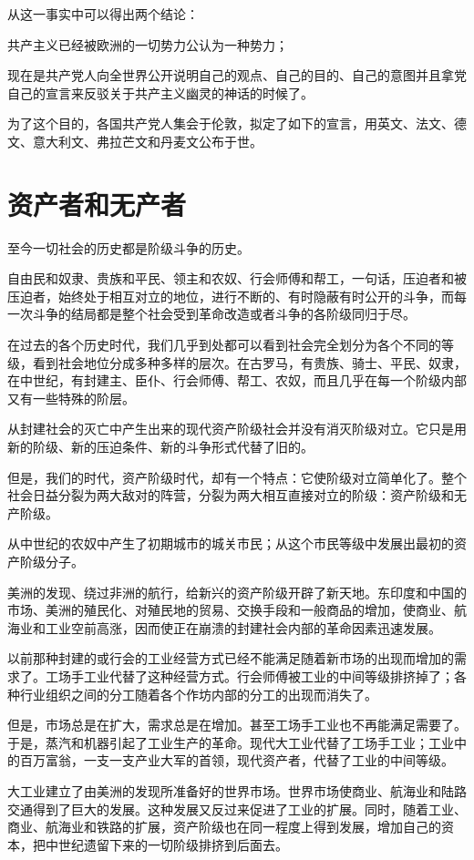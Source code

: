 \documentclass[10pt, UTF8]{book} %
\begin{document}
从这一事实中可以得出两个结论：

共产主义已经被欧洲的一切势力公认为一种势力；

现在是共产党人向全世界公开说明自己的观点、自己的目的、自己的意图并且拿党自己的宣言来反驳关于共产主义幽灵的神话的时候了。

为了这个目的，各国共产党人集会于伦敦，拟定了如下的宣言，用英文、法文、德文、意大利文、弗拉芒文和丹麦文公布于世。

\section{资产者和无产者}

至今一切社会的历史都是阶级斗争的历史。

自由民和奴隶、贵族和平民、领主和农奴、行会师傅和帮工，一句话，压迫者和被压迫者，始终处于相互对立的地位，进行不断的、有时隐蔽有时公开的斗争，而每一次斗争的结局都是整个社会受到革命改造或者斗争的各阶级同归于尽。

在过去的各个历史时代，我们几乎到处都可以看到社会完全划分为各个不同的等级，看到社会地位分成多种多样的层次。在古罗马，有贵族、骑士、平民、奴隶，在中世纪，有封建主、臣仆、行会师傅、帮工、农奴，而且几乎在每一个阶级内部又有一些特殊的阶层。

从封建社会的灭亡中产生出来的现代资产阶级社会并没有消灭阶级对立。它只是用新的阶级、新的压迫条件、新的斗争形式代替了旧的。

但是，我们的时代，资产阶级时代，却有一个特点：它使阶级对立简单化了。整个社会日益分裂为两大敌对的阵营，分裂为两大相互直接对立的阶级：资产阶级和无产阶级。

从中世纪的农奴中产生了初期城市的城关市民；从这个市民等级中发展出最初的资产阶级分子。

美洲的发现、绕过非洲的航行，给新兴的资产阶级开辟了新天地。东印度和中国的市场、美洲的殖民化、对殖民地的贸易、交换手段和一般商品的增加，使商业、航海业和工业空前高涨，因而使正在崩溃的封建社会内部的革命因素迅速发展。

以前那种封建的或行会的工业经营方式已经不能满足随着新市场的出现而增加的需求了。工场手工业代替了这种经营方式。行会师傅被工业的中间等级排挤掉了；各种行业组织之间的分工随着各个作坊内部的分工的出现而消失了。

但是，市场总是在扩大，需求总是在增加。甚至工场手工业也不再能满足需要了。于是，蒸汽和机器引起了工业生产的革命。现代大工业代替了工场手工业；工业中的百万富翁，一支一支产业大军的首领，现代资产者，代替了工业的中间等级。

大工业建立了由美洲的发现所准备好的世界市场。世界市场使商业、航海业和陆路交通得到了巨大的发展。这种发展又反过来促进了工业的扩展。同时，随着工业、商业、航海业和铁路的扩展，资产阶级也在同一程度上得到发展，增加自己的资本，把中世纪遗留下来的一切阶级排挤到后面去。
\end{document}
